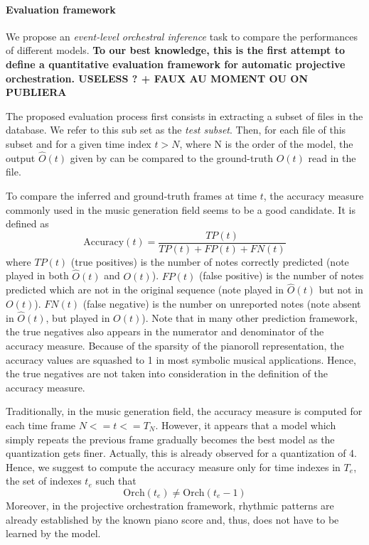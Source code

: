 \documentclass[twoside,twocolumn]{article}
\begin{document}
\paragraph{Evaluation framework}
We propose an \textit{event-level orchestral inference} task to compare the performances of different models. \textbf{To our best knowledge, this is the first attempt to define a quantitative evaluation framework for automatic projective orchestration. USELESS ? + FAUX AU MOMENT OU ON PUBLIERA}

The proposed evaluation process first consists in extracting a subset of files in the database. We refer to this sub set as the \textit{test subset}. Then, for each file of this subset and for a given time index $t > N$, where N is the order of the model, the output $\hat{O}(t)$ given by  can be compared to the ground-truth $O(t)$ read in the file.

To compare the inferred and ground-truth frames at time $t$, the accuracy measure commonly used in the music generation field \cite{DBLP:journals/corr/YaoCVDD15,boulanger2012modeling,lavrenko2003polyphonic} seems to be a good candidate. It is defined as
\begin{equation}
\text{Accuracy}(t)  = \frac{TP(t)}{TP(t) + FP(t) + FN(t)}
\label{eq:accuracy}
\end{equation}
where $TP(t)$ (true positives) is the number of notes correctly predicted (note played in both $\hat{O}(t)$ and $O(t)$). $FP(t)$ (false positive) is the number of notes predicted which are not in the original sequence (note played in $\hat{O}(t)$ but not in $O(t)$). $FN(t)$ (false negative) is the number on unreported notes (note absent in $\hat{O}(t)$, but played in $O(t)$). 
Note that in many other prediction framework, the true negatives also appears in the numerator and denominator of the accuracy measure. Because of the sparsity of the pianoroll representation, the accuracy values are squashed to 1 in most symbolic musical applications. Hence, the true negatives are not taken into consideration in the definition of the accuracy measure.

Traditionally, in the music generation field, the accuracy measure is computed for each time frame $N <= t <= T_{N}$. However, it appears that a model which simply repeats the previous frame gradually becomes the best model as the quantization gets finer. Actually, this is already observed for a quantization of 4.
Hence, we suggest to compute the accuracy measure only for time indexes in $T_e$, the set of indexes $t_e$ such that
\[\text{Orch}(t_{e}) \neq \text{Orch}(t_{e} - 1)\]
Moreover, in the projective orchestration framework, rhythmic patterns are already established by the known piano score and, thus, does not have to be learned by the model.
\end{document}

